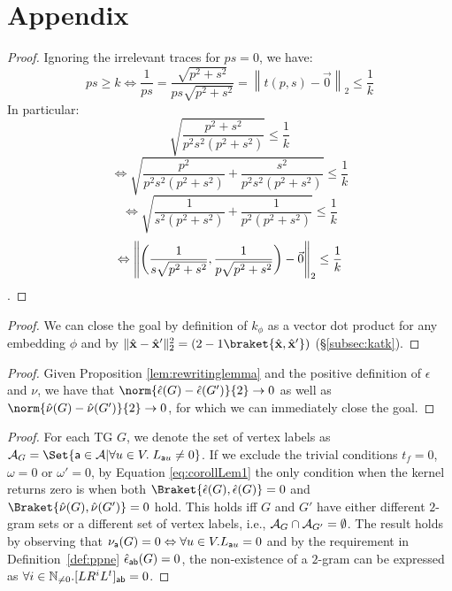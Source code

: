 \appendix
\section{Appendix}

\makeatletter
{}
\makeatother

\transfspace*
\begin{proof} 
Ignoring the irrelevant traces for $ps= 0$, we have:
	\[
	ps\geq k\Leftrightarrow \frac{1}{ps}=
	{ \frac{\sqrt{p^2+s^2}}{ps\sqrt{p^2+s^2}}= \left\|t(p,s)-\vec{0}\right\|_2\leq\frac{1}{k} }\]
In particular:
\[
 \sqrt{\frac{p^2+s^2}{p^2s^2(p^2+s^2)}}\leq\frac{1}{k} \]
\[	{\Leftrightarrow \sqrt{\frac{p^2}{p^2s^2(p^2+s^2)}+\frac{s^2}{p^2s^2(p^2+s^2)}}\leq\frac{1}{k}} \]
\[	{\Leftrightarrow \sqrt{\frac{1}{s^2(p^2+s^2)}+\frac{1}{p^2(p^2+s^2)}}\leq\frac{1}{k}} \]\[
	{\Leftrightarrow \left\|{\biggr({\frac{1}{s\sqrt{p^2+s^2}},\frac{1}{p\sqrt{p^2+s^2}}\biggr)}-\vec{0}}\right\|_2\leq\frac{1}{k}} \\
\]
.
\end{proof}


\rewritinglemma*
\begin{proof} We can close the goal by definition of $k_{\phi}$ as a vector dot product for any embedding $\phi$ and by  $\|\hat{\mathbf{x}}-\hat{\mathbf{x}}'\|_2^2=(2-1\braket{\hat{\mathbf{x}},\hat{\mathbf{x}}'})$ (\S\ref{subsec:katk}).
\end{proof}

\we*
\begin{proof}
	Given Proposition \ref{lem:rewritinglemma} and the positive definition of $\epsilon$ and $\nu$,  we have that $\norm{\hat{\epsilon}(G)-\hat{\epsilon}(G')}{2}\to 0$ as well as $\norm{\hat{\nu}(G)-\hat{\nu}(G')}{2}\to 0$, for which we can immediately close the goal.
\end{proof}

\sdiss*
\begin{proof}
{For each TG $G$, we denote the set of vertex labels as 
$\tasks_G=\Set{\const{a}\in\tasks|\forall u\in V.\; L_{\const{a}u}\neq 0}$.} 
If we exclude the trivial conditions $t_f=0$, $\omega=0$ or $\omega'=0$, by Equation \ref{eq:corollLem1} the only condition 
when the kernel returns zero is when both $\Braket{\hat{\epsilon}(G),\hat{\epsilon}(G)}=0$ and 
$\Braket{\hat{\nu}(G),\hat{\nu}(G')}=0$ hold. {This holds  iff $G$ and $G'$ have either different $2$-gram sets or a different 
set of vertex labels, i.e., $\mathcal{A}_G\cap \mathcal{A}_{G'}=\emptyset$.} {The result holds by observing that 
$\nu_{\mathsf{a}}(G)=0\Leftrightarrow \forall u\in V. L_{\mathsf{a}u}=0$ and by the requirement in Definition~\ref{def:ppne} 
$\hat{\epsilon}_{\mathsf{ab}}(G)=0$, the non-existence of a  $2$-gram can be expressed as $\forall i\in\mathbb{N}_{\neq0}. [LR^iL^t]_{\mathsf{ab}}=0$.}
\end{proof}


